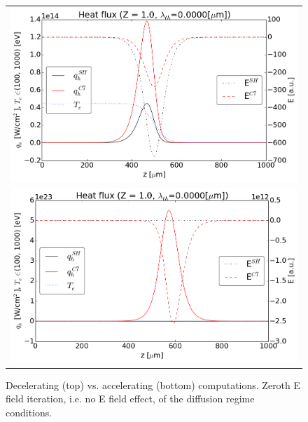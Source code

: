 \begin{figure}[tbh]
  \begin{center}
    \begin{tabular}{c}
      \includegraphics[width=1.0\textwidth]{../results/fe_analysis/figs/P5_diffusive_heatflux_Z1_decelerating_Ezerothiter.png} \\
      \includegraphics[width=1.0\textwidth]{../results/fe_analysis/figs/P5_diffusive_heatflux_Z1_accelerating_Ezerothiter.png}
    \end{tabular}
  \caption{
  Decelerating (top) vs. accelerating (bottom) computations. 
  Zeroth E field iteration, i.e.
  no E field effect, of the diffusion regime conditions.
  }
  \end{center}
  \label{fig:}
\end{figure}

\clearpage



